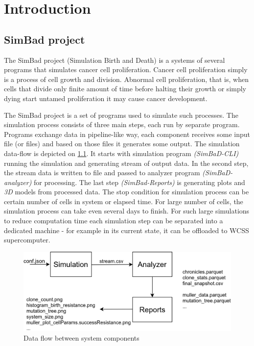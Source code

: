 \chapter{Introduction}
\section{SimBad project}
The SimBad project (Simulation Birth and Death) is a systems of several programs that simulates cancer cell proliferation. Cancer cell proliferation simply is a  process of cell growth and division. Abnormal cell proliferation, that is, when  cells that divide only finite amount of time before halting their growth or simply dying start untamed proliferation it may cause cancer development.

The SimBad project is a set of programs used to simulate such processes. The simulation process consists of three main steps, each run by separate program. Programs exchange data in pipeline-like way, each component receives some input file (or files) and based on those files it generates some output. The simulation data-flow is depicted on \ref{fig:data-flow}. It starts with simulation program \textit{(SimBaD-CLI)} running the simulation and generating stream of output data. In the second step, the stream data is written to file and passed to analyzer program \textit{(SimBaD-analyzer)} for processing. The last step \textit{(SimBad-Reports)} is generating plots and \textit{3D} models from processed data.
The stop condition for simulation process can be certain number of cells in system or elapsed time. For large number of cells, the simulation process can take even several days to finish. For such large simulations to reduce computation time each simulation step can be separated into a dedicated machine - for example in its current state, it can be offloaded to WCSS supercomputer. 
\begin{figure}[h!]
	\centering
		\includegraphics[width=0.9\linewidth]{diagrams/simbad-data-flow.png}
	\caption{Data flow between system components}
	\label{fig:data-flow}
\end{figure}
